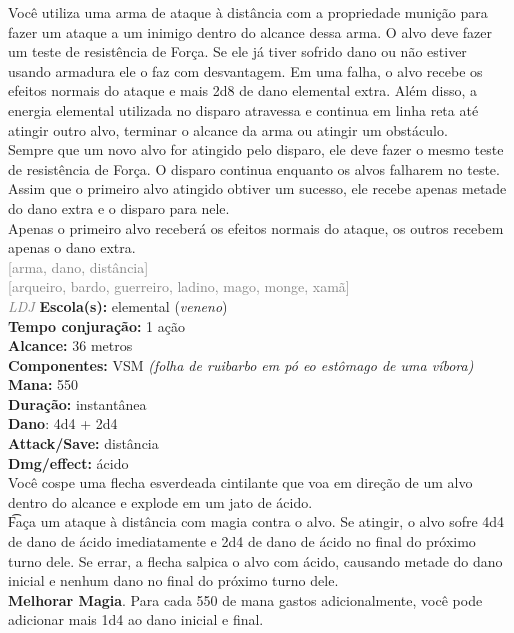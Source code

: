 \documentclass{RPG_Adventure}[2021/10/20]
\begin{document}
{\normalsize Você utiliza uma arma de ataque à distância com a propriedade munição para fazer um ataque a um inimigo dentro do alcance dessa arma. O alvo deve fazer um teste de resistência de Força. Se ele já tiver sofrido dano ou não estiver usando armadura ele o faz com desvantagem. Em uma falha, o alvo recebe os efeitos normais do ataque e mais 2d8 de dano elemental extra. Além disso, a energia elemental utilizada no disparo atravessa e continua em linha reta até atingir outro alvo, terminar o alcance da arma ou atingir um obstáculo.\\Sempre que um novo alvo for atingido pelo disparo, ele deve fazer o mesmo teste de resistência de Força. O disparo continua enquanto os alvos falharem no teste. Assim que o primeiro alvo atingido obtiver um sucesso, ele recebe apenas metade do dano extra e o disparo para nele.\\Apenas o primeiro alvo receberá os efeitos normais do ataque, os outros recebem apenas o dano extra.\\}
{\scriptsize \textcolor{gray}{[arma, dano, distância]\\}}
{\scriptsize \textcolor{gray}{[arqueiro, bardo, guerreiro, ladino, mago, monge, xamã]\\}}
{\tiny \textcolor{gray}{\textit{LDJ}}}\jump{}
{\small \t \textbf{Escola(s):} elemental (\textit{veneno})\\\t \textbf{Tempo conjuração:} 1 ação\\\t \textbf{Alcance:} 36 metros\\\t \textbf{Componentes:} VSM \textit{(folha de ruibarbo em pó eo estômago de uma víbora)}\\\t \textbf{Mana:} 550\\\t \textbf{Duração:} instantânea\\\t \textbf{Dano}: 4d4 + 2d4\\\t \textbf{Attack/Save:} distância\\\t \textbf{Dmg/effect:} ácido\\}
{\normalsize Você cospe uma flecha esverdeada cintilante que voa em direção de um alvo dentro do alcance e explode em um jato de ácido.\\\t Faça um ataque à distância com magia contra o alvo. Se atingir, o alvo sofre 4d4 de dano de ácido imediatamente e 2d4 de dano de ácido no final do próximo turno dele. Se errar, a flecha salpica o alvo com ácido, causando metade do dano inicial e nenhum dano no final do próximo turno dele.\\\t \textbf{Melhorar Magia}. Para cada 550 de mana gastos adicionalmente, você pode adicionar mais 1d4 ao dano inicial e final.\\}
\end{document}
